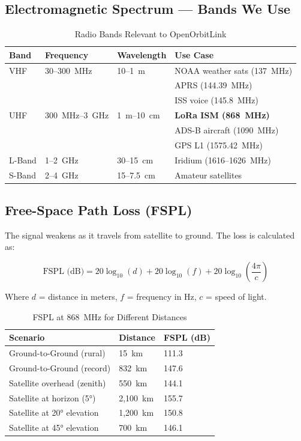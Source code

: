 \documentclass[12pt,a4paper]{article}
\begin{document}
\subsection{Electromagnetic Spectrum — Bands We Use}

\begin{table}[h!]
\centering
\caption{Radio Bands Relevant to OpenOrbitLink}
\begin{tabular}{@{}llll@{}}
\toprule
\textbf{Band} & \textbf{Frequency} & \textbf{Wavelength} & \textbf{Use Case} \\
\midrule
VHF & 30--300~MHz & 10--1~m & NOAA weather sats (137~MHz) \\
    &             &         & APRS (144.39~MHz) \\
    &             &         & ISS voice (145.8~MHz) \\
UHF & 300~MHz--3~GHz & 1~m--10~cm & \textbf{LoRa ISM (868~MHz)} \\
    &                &            & ADS-B aircraft (1090~MHz) \\
    &                &            & GPS L1 (1575.42~MHz) \\
L-Band & 1--2~GHz & 30--15~cm & Iridium (1616--1626~MHz) \\
S-Band & 2--4~GHz & 15--7.5~cm & Amateur satellites \\
\bottomrule
\end{tabular}
\end{table}

\subsection{Free-Space Path Loss (FSPL)}

The signal weakens as it travels from satellite to ground. The loss is calculated as:

\begin{equation}
    \text{FSPL (dB)} = 20 \log_{10}(d) + 20 \log_{10}(f) + 20 \log_{10}\left(\frac{4\pi}{c}\right)
\end{equation}

Where $d$ = distance in meters, $f$ = frequency in Hz, $c$ = speed of light.

\begin{table}[h!]
\centering
\caption{FSPL at 868~MHz for Different Distances}
\begin{tabular}{@{}lll@{}}
\toprule
\textbf{Scenario} & \textbf{Distance} & \textbf{FSPL (dB)} \\
\midrule
Ground-to-Ground (rural) & 15~km & 111.3 \\
Ground-to-Ground (record) & 832~km & 147.6 \\
Satellite overhead (zenith) & 550~km & 144.1 \\
Satellite at horizon (5°) & 2,100~km & 155.7 \\
Satellite at 20° elevation & 1,200~km & 150.8 \\
Satellite at 45° elevation & 700~km & 146.1 \\
\bottomrule
\end{tabular}
\end{table}
\end{document}
